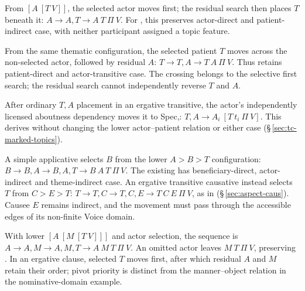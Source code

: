 \begin{description}[leftmargin=2em]
\item[\upshape Nominative-domain transitive.]
 From $[A\ [T\ V]]$, the selected actor moves first; the residual search
 then places $T$ beneath it: $A \longrightarrow A,T\longrightarrow
 A\ T\ \Pi\ V$. For , this preserves actor-direct
 and patient-indirect case, with neither participant assigned a topic feature.
\item[\upshape Ergative-domain transitive.]
 From the same thematic configuration, the selected patient $T$ moves
 across the non-selected actor, followed by residual $A$:
 $T\longrightarrow T,A\longrightarrow T\ A\ \Pi\ V$.
 Thus  retains patient-direct and
 actor-transitive case. The crossing belongs to the selective first search;
 the residual search cannot independently reverse $T$ and $A$.
\item[\upshape Linked actor topic.]
 After ordinary $T,A$ placement in an ergative transitive, the actor's
 independently licensed aboutness dependency moves it to Spec,:
 $T,A\longrightarrow A_i\ [T\ t_i\ \Pi\ V]$.
 This derives  without changing the lower
 actor--patient relation or either case (§\,\ref{sec:tc-marked-topics}).
\item[\upshape Additional participant.]
 A simple applicative selects $B$ from the lower $A>B>T$ configuration:
 $B\longrightarrow B,A\longrightarrow B,A,T\longrightarrow
 B\ A\ T\ \Pi\ V$. The existing 
 has beneficiary-direct, actor-indirect and theme-indirect case. An ergative
 transitive causative instead selects $T$ from $C>E>T$:
 $T\longrightarrow T,C\longrightarrow T,C,E\longrightarrow
 T\ C\ E\ \Pi\ V$, as in 
 (§\,\ref{sec:aspect-caus}). Causee $E$ remains indirect, and the movement
 must pass through the accessible edges of its non-finite Voice domain.
\item[\upshape Manner modification.]
 With lower $[A\ [M\ [T\ V]]]$ and actor selection, the sequence is
 $A\longrightarrow A,M\longrightarrow A,M,T\longrightarrow
 A\ M\ T\ \Pi\ V$. An omitted actor leaves $M\ T\ \Pi\ V$,
 preserving . In an ergative clause, selected
 $T$ moves first, after which residual $A$ and $M$ retain their order;
 pivot priority is distinct from the manner--object relation in the
 nominative-domain example.
\end{description}

